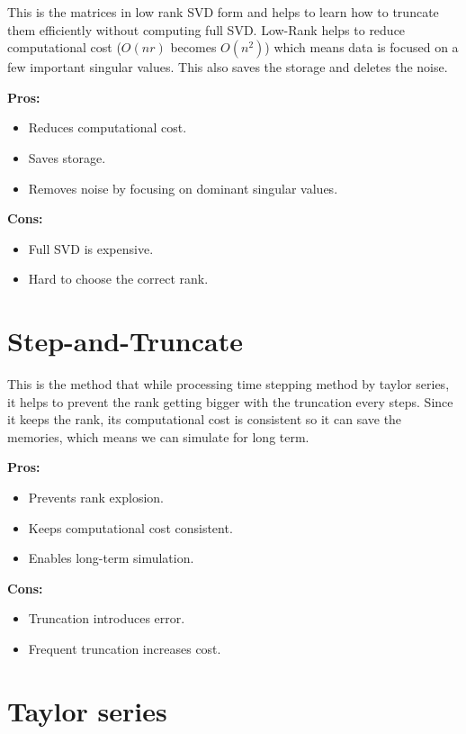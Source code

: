 \documentclass{article}
\begin{document}
This is the matrices in low rank SVD form and helps to learn how to truncate them efficiently without computing full SVD. Low-Rank helps to reduce computational cost ($O(nr)$ becomes $O(n^2)$) which means data is focused on a few important singular values. This also saves the storage and deletes the noise.

\textbf{Pros:}
\begin{itemize}
    \item Reduces computational cost.
    \item Saves storage.
    \item Removes noise by focusing on dominant singular values.
\end{itemize}

\textbf{Cons:}
\begin{itemize}
    \item Full SVD is expensive.
    \item Hard to choose the correct rank.
\end{itemize}


\section*{Step-and-Truncate}

This is the method that while processing time stepping method by taylor series, it helps to prevent the rank getting bigger with the truncation every steps. Since it keeps the rank, its computational cost is consistent so it can save the memories, which means we can simulate for long term.

\textbf{Pros:}
\begin{itemize}
    \item Prevents rank explosion.
    \item Keeps computational cost consistent.
    \item Enables long-term simulation.
\end{itemize}

\textbf{Cons:}
\begin{itemize}
    \item Truncation introduces error.
    \item Frequent truncation increases cost.
\end{itemize}

\section*{Taylor series}
\end{document}
